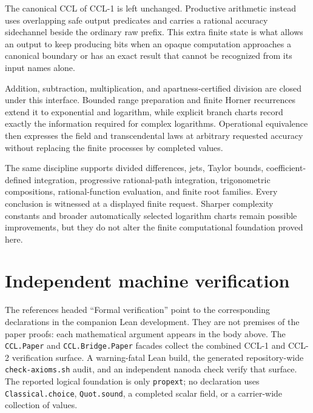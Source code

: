 \documentclass[10pt]{article}
\theoremstyle{definition}
\theoremstyle{remark}
\begin{document}
The canonical CCL of CCL-1 is left unchanged.  Productive arithmetic instead
uses overlapping safe output predicates and carries a rational accuracy
sidechannel beside the ordinary raw prefix.  This extra finite state is what
allows an output to keep producing bits when an opaque computation approaches
a canonical boundary or has an exact result that cannot be recognized from
its input names alone.

Addition, subtraction, multiplication, and apartness-certified division are
closed under this interface.  Bounded range preparation and finite Horner
recurrences extend it to exponential and logarithm, while explicit branch
charts record exactly the information required for complex logarithms.
Operational equivalence then expresses the field and transcendental laws at
arbitrary requested accuracy without replacing the finite processes by
completed values.

The same discipline supports divided differences, jets, Taylor bounds,
coefficient-defined integration, progressive rational-path integration,
trigonometric compositions, rational-function evaluation, and finite root
families.  Every conclusion is witnessed at a displayed finite request.
Sharper complexity constants and broader automatically selected logarithm
charts remain possible improvements, but they do not alter the finite
computational foundation proved here.
\fi

\appendix
\section{Independent machine verification}

The references headed ``Formal verification'' point to the corresponding
declarations in the companion Lean development.  They are not premises of the
paper proofs: each mathematical argument appears in the body above.  The
\texttt{CCL.Paper} and \texttt{CCL.Bridge.Paper} facades collect the combined
CCL-1 and CCL-2 verification surface.  A warning-fatal Lean build, the
generated repository-wide \texttt{check-axioms.sh} audit, and an independent
nanoda check verify that surface.  The reported logical foundation is only
\texttt{propext}; no declaration uses \texttt{Classical.choice},
\texttt{Quot.sound}, a completed scalar field, or a carrier-wide collection
of values.
\end{document}
